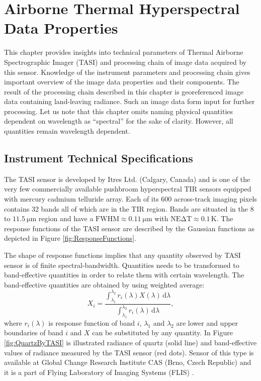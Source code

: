 \chapter{Airborne Thermal Hyperspectral Data Properties}
\label{chap:Data}

This chapter provides insights into technical parameters of Thermal Airborne Spectrographic Imager (TASI) and processing chain of image data acquired by this sensor. Knowledge of the instrument parameters and processing chain gives important overview of the image data properties and their components. The result of the processing chain described in this chapter is georeferenced image data containing land-leaving radiance. Such an image data form input for further processing. 
Let us note that this chapter omits naming physical quantities dependent on wavelength as ``spectral'' for the sake of clarity. However, all quantities remain wavelength dependent.

\section{Instrument Technical Specifications}

The TASI sensor is developed by Itres Ltd. (Calgary, Canada) and is one of the very few commercially available pushbroom hyperspectral TIR sensors equipped with mercury cadmium telluride array. Each of its 600 across-track imaging pixels contains 32 bands all of which are in the TIR region. Bands are situated in the 8 to $\SI{11.5}{\micro\meter}$ region and have a $\mathrm{FWHM} \approx \SI{0.11}{\micro\meter}$ with $\mathrm{NE\Delta T} \approx 0.1\,\mathrm{K}$. The response functions of the TASI sensor are described by the Gaussian functions as depicted in Figure \ref{fig:ResponseFunctions}. 

The shape of response functions implies that any quantity observed by TASI sensor is of finite spectral-bandwidth. Quantities needs to be transformed to band-effective quantities in order to relate them with certain wavelength. The band-effective quantities are obtained by using weighted average:
\begin{equation}
	X_i = \frac{\int_{\lambda_1}^{\lambda_2} r_i(\lambda) X(\lambda) \,\mathrm{d}\lambda}{\int_{\lambda_1}^{\lambda_2} r_i(\lambda)\,\mathrm{d}\lambda},
	\label{eq:weightedAverage}
\end{equation}
where $r_i(\lambda)$ is response function of band $i$, $\lambda_1$ and $\lambda_2$ are lower and upper boundaries of band $i$ and $X$ can be substituted by any quantity. In Figure \ref{fig:QuartzByTASI} is illustrated radiance of quartz (solid line) and band-effective values of radiance measured by the TASI sensor (red dots). Sensor of this type is available at Global Change Research Institute CAS (Brno, Czech Republic) and it is a part of Flying Laboratory of Imaging Systems (FLIS) \cite{HF14}.

